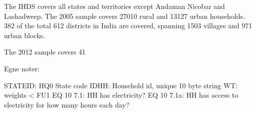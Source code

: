 
The IHDS covers all states and territories except Andaman Nicobar and Lashadweep. The 2005 sample covers 27010 rural and 13127 urban households. 382 of the total 612 districts in India are covered, spanning 1503 villages and 971 urban blocks. 

The 2012 sample covers 41

Egne noter:

STATEID: HQ0 State code
IDHH: Household id, unique 10 byte string
WT: weights <
FU1 EQ 10 7.1: HH has electricity?
EQ 10 7.1a: HH has access to electricity for how many hours each day?
